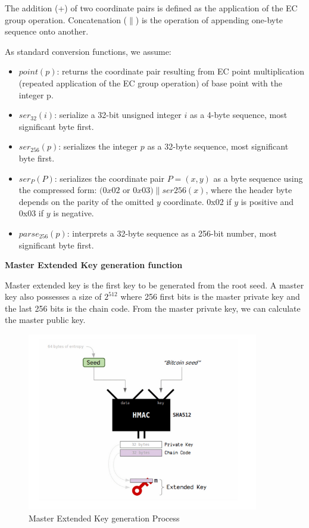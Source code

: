 The addition (+) of two coordinate pairs is defined as the application of the EC group operation. Concatenation ($\parallel$) is the operation of appending one-byte sequence onto another.

As standard conversion functions, we assume:

\begin{itemize}
    \item $point(p)$: returns the coordinate pair resulting from EC point multiplication (repeated application of the EC group operation) of base point with the integer p.

    \item $ser_{32}(i)$: serialize a 32-bit unsigned integer $i$ as a 4-byte sequence, most significant byte first.

    \item $ser_{256}(p)$: serializes the integer $p$ as a 32-byte sequence, most significant byte first.
    \item $ser_P(P)$: serializes the coordinate pair $P = (x,y)$ as a byte sequence using the compressed form: $(0x02$ or $0x03) \parallel ser256(x)$, where the header byte depends on the parity of the omitted $y$ coordinate. 0x02 if $y$ is positive and 0x03 if $y$ is negative.
    \item $parse_{256}(p)$: interprets a 32-byte sequence as a 256-bit number, most significant byte first.
\end{itemize}


\bigskip
{\textbf{Master Extended Key generation function}}

Master extended key is the first key to be generated from the root seed. A master key also possesses a size of $2^{512}$ where 256 first bits is the master private key and the last 256 bits is the chain code. From the master private key, we can calculate the master public key.

\begin{figure}[ht!]
    \centering
    \includegraphics[width=0.9\textwidth]{images/masterbip32.png}
    \caption[Master Extended Key generation Process]{Master Extended Key generation Process}
    \label{fig:master_bip32}
\end{figure}

